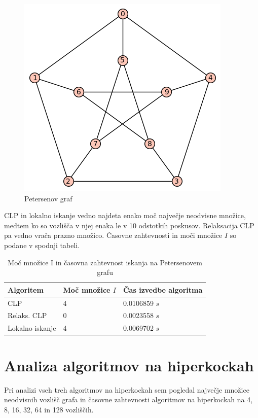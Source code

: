 \documentclass[a4paper, 12 pt]{article}
\theoremstyle{definition}
\theoremstyle{plain}
\theoremstyle{remark}
\begin{document}
\begin{figure}[H]
\centering
  \includegraphics[scale=0.28]{Petersenov graf.png}
  \caption{Petersenov graf}
\end{figure}

CLP in lokalno iskanje vedno najdeta enako moč največje neodvisne množice, medtem ko so vozlišča v njej enaka le v 10 odstotkih poskusov. Relaksacija CLP pa vedno vrača prazno množico. Časovne zahtevnosti in moči množice $I$ so podane v spodnji tabeli.

\begin{table}[H]
\centering
\begin{tabular}{|p{3cm}|p{2.7cm}|p{4.7cm}|}
\hline
\textbf{Algoritem}  & \textbf{Moč množice $I$} & \textbf{Čas izvedbe algoritma} \\ \hline
CLP    & 4 &  		   0.0106859 $s$\\ \hline
Relaks. CLP    & 0  &  0.0023558 $s$   \\ \hline
Lokalno iskanje & 4 &  0.0069702 $s$ \\ \hline
\end{tabular}
\caption{Moč množice I in časovna zahtevnost iskanja na Petersenovem grafu}
\label{fig:petersenov} 
\end{table}

\section{Analiza algoritmov na hiperkockah}
Pri analizi vseh treh algoritmov na hiperkockah sem pogledal največje množice neodvisnih vozlišč grafa in časovne zahtevnosti algoritmov na hiperkockah na 4, 8, 16, 32, 64 in 128 vozliščih. 
\end{document}
